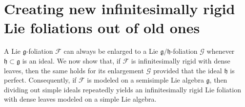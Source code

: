 \documentclass[11pt, letterpaper, oneside,reqno]{amsart}
\theoremstyle{plain}
\theoremstyle{underline}
\theoremstyle{definition}
\theoremstyle{remark}
\begin{document}
	
	\section{Creating new infinitesimally rigid Lie foliations out of old ones}\label{sec:four}
	
	A Lie $\mathfrak{g}$-foliation $\mathcal{F}$ can always be enlarged to a Lie $\mathfrak{g}/\mathfrak{h}$-foliation $\mathcal{G}$ whenever $\mathfrak{h}\subset\mathfrak{g}$ is an ideal. We now show that, if $\mathcal{F}$ is infinitesimally rigid with dense leaves, then the same holds for its enlargement $\mathcal{G}$ provided that the ideal $\mathfrak{h}$ is perfect. Consequently, if $\mathcal{F}$ is modeled on a semisimple Lie algebra $\mathfrak{g}$, then dividing out simple ideals repeatedly yields an infinitesimally rigid Lie foliation with dense leaves modeled on a simple Lie algebra.
	
	\vspace{0.3cm}
	
\end{document}
